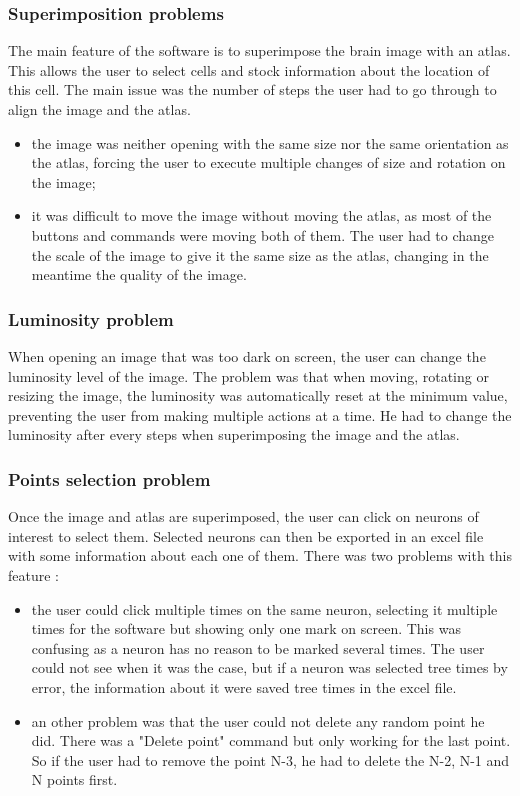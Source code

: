 \documentclass[a4paper,12pt]{report}
\begin{document}
\subsubsection{Superimposition problems}
The main feature of the software is to superimpose the brain image with an atlas. This allows the user to select cells and stock information about the location of this cell. The main issue was the number of steps the user had to go through to align the image and the atlas.
\begin{itemize}
    \item the image was neither opening with the same size nor the same orientation as the atlas, forcing the user to execute multiple changes of size and rotation on the image;
    \item it was difficult to move the image without moving the atlas, as most of the buttons and commands were moving both of them. The user had to change the scale of the image to give it the same size as the atlas, changing in the meantime the quality of the image.\\
\end{itemize}

\subsubsection{Luminosity problem}
When opening an image that was too dark on screen, the user can change the luminosity level of the image. The problem was that when moving, rotating or resizing the image, the luminosity was automatically reset at the minimum value, preventing the user from making multiple actions at a time. He had to change the luminosity after every steps when superimposing the image and the atlas. \\

\subsubsection{Points selection problem}
Once the image and atlas are superimposed, the user can click on neurons of interest to select them. Selected neurons can then be exported in an excel file with some information about each one of them. There was two problems with this feature :
\begin{itemize}
    \item the user could click multiple times on the same neuron, selecting it multiple times for the software but showing only one mark on screen. This was confusing as a neuron has no reason to be marked several times. The user could not see when it was the case, but if a neuron was selected tree times by error, the information about it were saved tree times in the excel file. 
    \item an other problem was that the user could not delete any random point he did. There was a "Delete point" command but only working for the last point. So if the user had to remove the point N-3, he had to delete the N-2, N-1 and N points first. \\
\end{itemize}
\end{document}
